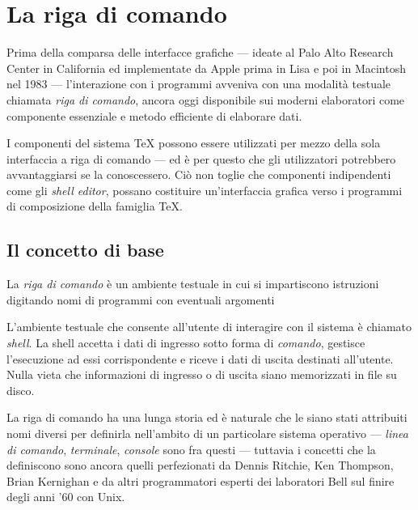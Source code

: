 
\chapter{La riga di comando}
\label{chapConsole}

Prima della comparsa delle interfacce grafiche --- ideate al Palo Alto Research
Center in California ed implementate da Apple prima in Lisa e poi in Macintosh
nel 1983 --- l'interazione con i programmi avveniva con una modalità testuale
chiamata \emph{riga di comando}, ancora oggi disponibile sui moderni elaboratori
come componente essenziale e metodo efficiente di elaborare dati.

I componenti del sistema \TeX{} possono essere utilizzati per mezzo della sola
interfaccia a riga di comando --- ed è per questo che gli utilizzatori
potrebbero avvantaggiarsi se la conoscessero. Ciò non toglie che componenti
indipendenti come gli \emph{shell editor}, possano costituire un'interfaccia
grafica verso i programmi di composizione della famiglia \TeX{}.

\section{Il concetto di base}

\begin{tcolorbox}[title=Definizione di \emph{Riga di comando}]
La \emph{riga di comando} è un ambiente testuale in cui si impartiscono
istruzioni digitando nomi di programmi con eventuali argomenti
\end{tcolorbox}

L'ambiente testuale che consente all'utente di interagire con il sistema è
chiamato \emph{shell}. La shell accetta i dati di ingresso sotto forma di
\emph{comando}, gestisce l'esecuzione ad essi corrispondente e riceve i dati di
uscita destinati all'utente. Nulla vieta che informazioni di ingresso o di
uscita siano memorizzati in file su disco.

La riga di comando ha una lunga storia ed è naturale che le siano stati
attribuiti nomi diversi per definirla nell'ambito di un particolare sistema
operativo --- \emph{linea di comando}, \emph{terminale}, \emph{console} sono fra
questi --- tuttavia i concetti che la definiscono sono ancora quelli
perfezionati da Dennis Ritchie, Ken Thompson, Brian Kernighan e da altri
programmatori esperti dei laboratori Bell sul finire degli anni '60 con Unix.

